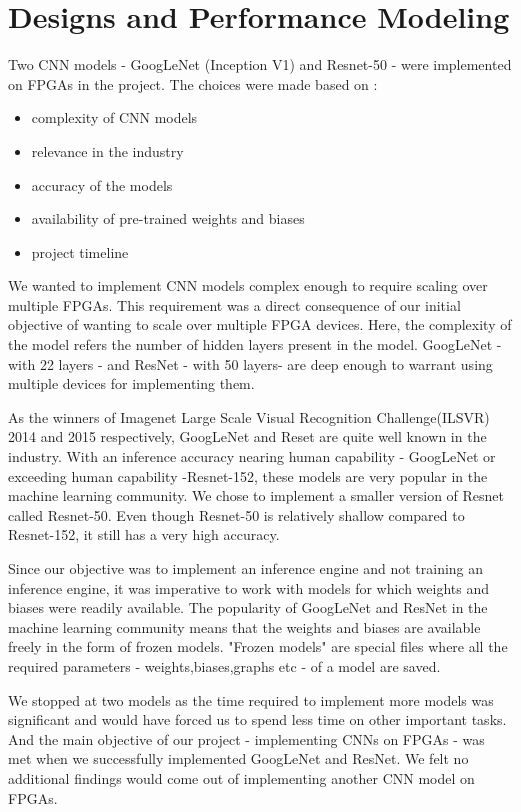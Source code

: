 \chapter{Designs and Performance Modeling}

Two CNN models - GoogLeNet (Inception V1) and Resnet-50 - were implemented on FPGAs in the project. The choices were made based on :  
\begin{itemize}
  \item complexity of CNN models
  \item relevance in the industry
  \item accuracy of the models
  \item availability of pre-trained weights and biases
  \item project timeline
\end{itemize}  
We wanted to implement CNN models complex enough to require scaling over multiple FPGAs. This requirement was a direct consequence of our initial objective of wanting to scale over multiple FPGA devices. Here, the complexity of the model refers the number of hidden layers present in the model. GoogLeNet - with  22 layers - and ResNet - with 50 layers- are deep enough to warrant using multiple devices for implementing them.

As the winners of Imagenet Large Scale Visual Recognition Challenge(ILSVR) 2014 and 2015 respectively, GoogLeNet and Reset are quite well known in the industry. With an inference accuracy nearing human capability - GoogLeNet or exceeding human capability -Resnet-152, these models are very popular in the machine learning community. We chose to implement a smaller version of Resnet called Resnet-50. Even though Resnet-50 is relatively shallow compared to Resnet-152, it still has a very high accuracy.

Since our objective was to implement an inference engine and not training an inference engine, it was imperative to work with models for which weights and biases were readily available. The popularity of GoogLeNet and ResNet in the machine learning community means that the weights and biases are available freely in the form of frozen models. "Frozen models" are special files where all the required parameters - weights,biases,graphs etc - of a model are saved.

We stopped at two models as the time required to implement more models was significant and would have forced us to spend less time on other important tasks. And the main objective of our project - implementing CNNs on FPGAs - was met when we successfully implemented GoogLeNet and ResNet. We felt no additional findings would come out of implementing another CNN model on FPGAs.

